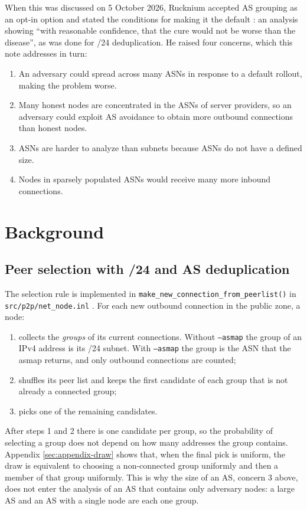 \documentclass[english]{mrl}
\theoremstyle{plain}
\begin{document}
When this was discussed on 5 October 2026, Rucknium accepted AS grouping as an opt-in option and stated the conditions for making it the default \cite{NWLB20261005}: an analysis showing ``with reasonable confidence, that the cure would not be worse than the disease'', as was done for /24 deduplication. He raised four concerns, which this note addresses in turn:
\begin{enumerate}
\item An adversary could spread across many ASNs in response to a default rollout, making the problem worse.
\item Many honest nodes are concentrated in the ASNs of server providers, so an adversary could exploit AS avoidance to obtain more outbound connections than honest nodes.
\item ASNs are harder to analyze than subnets because ASNs do not have a defined size.
\item Nodes in sparsely populated ASNs would receive many more inbound connections.
\end{enumerate}

\section{Background}

\subsection{Peer selection with /24 and AS deduplication}

The selection rule is implemented in \texttt{make\_new\_connection\_from\_peerlist()} in \texttt{src/p2p/net\_node.inl} \cite{MoneroPR11474}. For each new outbound connection in the public zone, a node:
\begin{enumerate}
\item collects the \emph{groups} of its current connections. Without \texttt{--asmap} the group of an IPv4 address is its /24 subnet. With \texttt{--asmap} the group is the ASN that the asmap returns, and only outbound connections are counted;
\item shuffles its peer list and keeps the first candidate of each group that is not already a connected group;
\item picks one of the remaining candidates.
\end{enumerate}
After steps 1 and 2 there is one candidate per group, so the probability of selecting a group does not depend on how many addresses the group contains. Appendix \ref{sec:appendix-draw} shows that, when the final pick is uniform, the draw is equivalent to choosing a non-connected group uniformly and then a member of that group uniformly. This is why the size of an AS, concern 3 above, does not enter the analysis of an AS that contains only adversary nodes: a large AS and an AS with a single node are each one group.
\end{document}
